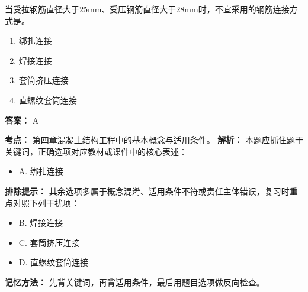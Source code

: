 \documentclass[UTF8,fontset=fandol,11pt]{ctexart}
\begin{document}
\vspace{0.2em}

\begin{quizbox}[title={第 20 题}]
当受拉钢筋直径大于25mm、受压钢筋直径大于28mm时，不宜采用的钢筋连接方式是。\\
\begin{enumerate}[label=\Alph*.]
\item 绑扎连接
\item 焊接连接
\item 套筒挤压连接
\item 直螺纹套筒连接
\end{enumerate}
\textbf{答案：} A
\vspace{0.25em}
\begin{answerbox}[title={考点解析}]
\textbf{考点：} 第四章混凝土结构工程中的基本概念与适用条件。
\textbf{解析：} 本题应抓住题干关键词，正确选项对应教材或课件中的核心表述：
\begin{itemize}
\item A. 绑扎连接
\end{itemize}
\textbf{排除提示：} 其余选项多属于概念混淆、适用条件不符或责任主体错误，复习时重点对照下列干扰项：
\begin{itemize}
\item B. 焊接连接
\item C. 套筒挤压连接
\item D. 直螺纹套筒连接
\end{itemize}
\textbf{记忆方法：} 先背关键词，再背适用条件，最后用题目选项做反向检查。
\end{answerbox}
\end{quizbox}

\vspace{0.2em}
\end{document}

